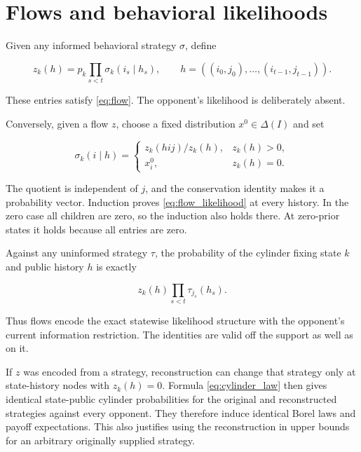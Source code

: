 \documentclass[11pt,a4paper]{article}
\begin{document}
\section{Flows and behavioral likelihoods}

Given any informed behavioral strategy \(\sigma\), define

\begin{equation}
z_k(h)=p_k\prod_{s<t}\sigma_k(i_s\mid h_s),
\qquad h=((i_0,j_0),\ldots,(i_{t-1},j_{t-1})).
\label{eq:flow_likelihood}
\end{equation}

These entries satisfy \eqref{eq:flow}. The opponent's likelihood is deliberately absent.

Conversely, given a flow \(z\), choose a fixed distribution \(x^0\in\Delta(I)\) and set

\begin{equation}
\sigma_k(i\mid h)=
\begin{cases}
z_k(hij)/z_k(h),&z_k(h)>0,\\
x^0_i,&z_k(h)=0.
\end{cases}
\label{eq:flow_reconstruction}
\end{equation}

The quotient is independent of \(j\), and the conservation identity makes it a probability vector. Induction proves \eqref{eq:flow_likelihood} at every history. In the zero case all children are zero, so the induction also holds there. At zero-prior states it holds because all entries are zero.

Against any uninformed strategy \(\tau\), the probability of the cylinder fixing state \(k\) and public history \(h\) is exactly

\begin{equation}
z_k(h)\prod_{s<t}\tau_{j_s}(h_s). \label{eq:cylinder_law}
\end{equation}

Thus flows encode the exact statewise likelihood structure with the opponent's current information restriction. The identities are valid off the support as well as on it.

If \(z\) was encoded from a strategy, reconstruction can change that strategy only at state-history nodes with \(z_k(h)=0\). Formula \eqref{eq:cylinder_law} then gives identical state-public cylinder probabilities for the original and reconstructed strategies against every opponent. They therefore induce identical Borel laws and payoff expectations. This also justifies using the reconstruction in upper bounds for an arbitrary originally supplied strategy.
\end{document}
